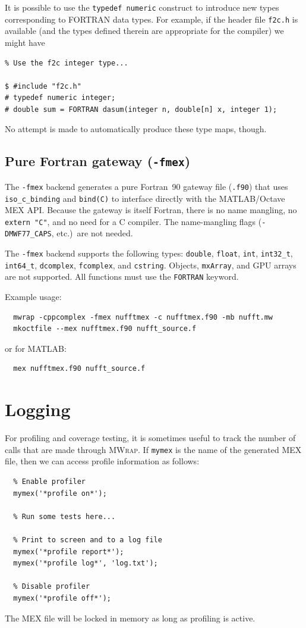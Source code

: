 \documentclass[12pt]{article}
\newcommand{\mwrap}{\textsc{MWrap}}
\begin{document}
It is possible to use the {\tt typedef numeric} construct to introduce
new types corresponding to FORTRAN data types.  For example, if the
header file {\tt f2c.h} is available (and the types defined therein are
appropriate for the compiler) we might have
\begin{verbatim}
% Use the f2c integer type...

$ #include "f2c.h"
# typedef numeric integer;
# double sum = FORTRAN dasum(integer n, double[n] x, integer 1);
\end{verbatim}
No attempt is made to automatically produce these type maps, though.

\subsection{Pure Fortran gateway ({\tt -fmex})}

The {\tt -fmex} backend generates a pure Fortran~90 gateway file
({\tt .f90}) that uses {\tt iso\_c\_binding} and {\tt bind(C)} to
interface directly with the MATLAB/Octave MEX API.  Because the
gateway is itself Fortran, there is no name mangling, no
{\tt extern "C"}, and no need for a C compiler.  The name-mangling
flags ({\tt -DMWF77\_CAPS}, etc.)\ are not needed.

The {\tt -fmex} backend supports the following types: {\tt double},
{\tt float}, {\tt int}, {\tt int32\_t}, {\tt int64\_t}, {\tt dcomplex},
{\tt fcomplex}, and {\tt cstring}.  Objects, {\tt mxArray}, and GPU
arrays are not supported.  All functions must use the {\tt FORTRAN}
keyword.

Example usage:
\begin{verbatim}
  mwrap -cppcomplex -fmex nufftmex -c nufftmex.f90 -mb nufft.mw
  mkoctfile --mex nufftmex.f90 nufft_source.f
\end{verbatim}
or for MATLAB:
\begin{verbatim}
  mex nufftmex.f90 nufft_source.f
\end{verbatim}


\section{Logging}

For profiling and coverage testing, it is sometimes useful to track the
number of calls that are made through \mwrap.  If {\tt mymex} is the name
of the generated MEX file, then we can access profile information as
follows:
\begin{verbatim}
  % Enable profiler
  mymex('*profile on*');

  % Run some tests here...

  % Print to screen and to a log file
  mymex('*profile report*');
  mymex('*profile log*', 'log.txt');

  % Disable profiler
  mymex('*profile off*');
\end{verbatim}

The MEX file will be locked in memory as long as profiling is active.
\end{document}
